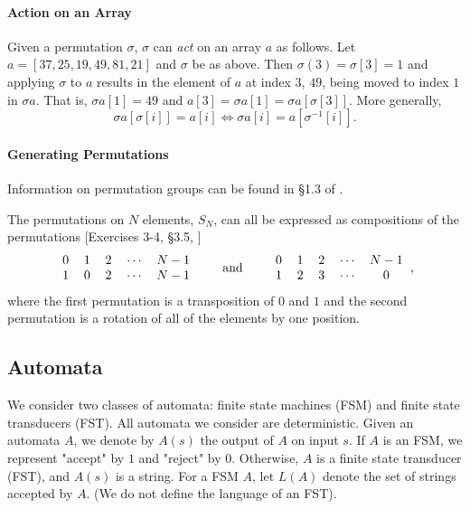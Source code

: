 \documentclass{llncs}
\begin{document}
\paragraph{Action on an Array}

Given a permutation \(\sigma\), \(\sigma\) can {\it act} on an array \(a\) as follows.  Let \(a = [37, 25, 19, 49, 81, 21]\) and \(\sigma\) be as above.  Then \(\sigma(3) = \sigma[3] = 1\) and applying \(\sigma\) to \(a\) results in the element of \(a\) at index \(3\), \(49\), being moved to index \(1\) in \(\sigma a\).  That is, \(\sigma a[1] = 49\) and \(a[3] = \sigma a[1] = \sigma a[\sigma[3]]\).  More generally,
\begin{equation}
\sigma a[\sigma[i]] = a[i] \Longleftrightarrow \sigma a[i] = a[\sigma^{-1}[i]].
\label{action}
\end{equation}

\paragraph{Generating Permutations}
Information on permutation groups can be found in \S1.3 of \cite{dummitfoote}.

\makeatletter
\renewcommand{\@cite}[1]{#1}
\makeatother
The permutations on \(N\) elements, \(S_{N}\), can all be expressed as compositions of the permutations [Exercises 3-4, \S3.5, \cite{dummitfoote}]
\[\begin{tabular}{ccccc}
0 & 1 & 2 & \(\dotsm\) & \(N-1\)\\
1 & 0 & 2 & \(\dotsm\) & \(N-1\)
\end{tabular}
\qquad\textrm{and}\qquad
\begin{tabular}{ccccc}
0 & 1 & 2 & \(\dotsm\) & \(N-1\)\\
1 & 2 & 3 & \(\dotsm\) & 0
\end{tabular},\]
\makeatletter
\renewcommand{\@cite}[1]{[#1]}
\makeatother
where the first permutation is a transposition of \(0\) and \(1\) and the second permutation is a rotation of all of the elements by one position.

\subsection{Automata}
We consider two classes of automata: finite state machines (FSM) and finite state transducers (FST). All automata we consider are deterministic. Given an automata $A$, we denote by $A(s)$ the output of $A$ on input $s$. If $A$ is an FSM, we represent "accept" by $1$ and "reject" by $0$. Otherwise, $A$ is a finite state transducer (FST), and $A(s)$ is a string. For a FSM $A$, let $L(A)$ denote the set of strings accepted by $A$. (We do not define the language of an FST).
\end{document}
